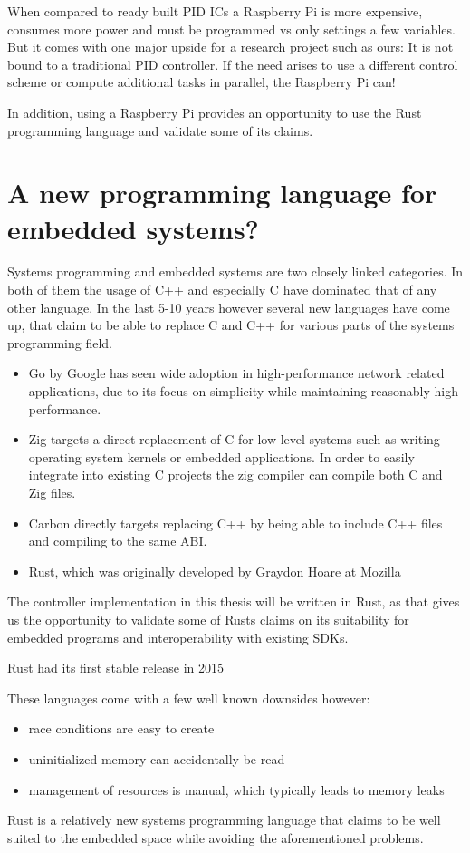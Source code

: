 When compared to ready built PID ICs a Raspberry Pi is more expensive, consumes more power and must be programmed vs only settings a few variables.
But it comes with one major upside for a research project such as ours:
It is not bound to a traditional PID controller. If the need arises to use a different control scheme or compute additional tasks in parallel, the Raspberry Pi can!

In addition, using a Raspberry Pi provides an opportunity to use the Rust programming language and validate some of its claims.

\section{A new programming language for embedded systems?}
\label{sec:introduction:rust}

Systems programming and embedded systems are two closely linked categories.
In both of them the usage of C++ and especially C have dominated that of any other language.
In the last 5-10 years however several new languages have come up,
that claim to be able to replace C and C++ for various parts of the systems programming field.
\begin{itemize}
    \item Go by Google has seen wide adoption in high-performance network related applications, due to its focus on simplicity while maintaining reasonably high performance.
    \item Zig targets a direct replacement of C for low level systems such as writing operating system kernels or embedded applications. In order to easily integrate into existing C projects the zig compiler can compile both C and Zig files.
    \item Carbon directly targets replacing C++ by being able to include C++ files and compiling to the same ABI.
    \item Rust, which was originally developed by Graydon Hoare at Mozilla
\end{itemize}

The controller implementation in this thesis will be written in Rust,
as that gives us the opportunity to validate some of Rusts claims on its suitability for embedded programs and interoperability with existing SDKs.

Rust had its first stable release in 2015 


These languages come with a few well known downsides however:
\begin{itemize}
    \item race conditions are easy to create
    \item uninitialized memory can accidentally be read
    \item management of resources is manual, which typically leads to memory leaks 
\end{itemize}

Rust is a relatively new systems programming language that claims to be well suited to the embedded space while avoiding the aforementioned problems.
